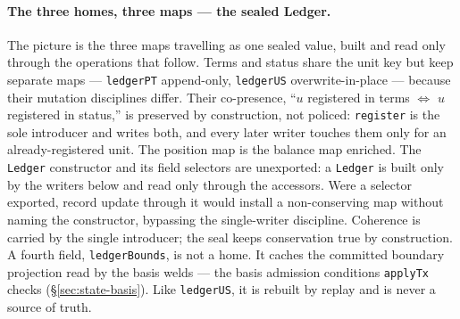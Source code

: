 \paragraph{The three homes, three maps --- the sealed Ledger.}
The picture is the three maps travelling as one sealed value, built and read only through
the operations that follow. Terms and status share the unit key but keep separate maps
--- \texttt{ledgerPT} append-only, \texttt{ledgerUS} overwrite-in-place --- because their
mutation disciplines differ. Their co-presence, ``$u$ registered in terms $\iff$ $u$
registered in status,'' is preserved by construction, not policed: \texttt{register} is
the sole introducer and writes both, and every later writer touches them only for an
already-registered unit. The position map is the balance map enriched. The
\texttt{Ledger} constructor and its field selectors are unexported: a \texttt{Ledger} is
built only by the writers below and read only through the accessors. Were a selector
exported, record update through it would install a non-conserving map without naming the
constructor, bypassing the single-writer discipline. Coherence is carried by the single
introducer; the seal keeps conservation true by construction. A fourth field,
\texttt{ledgerBounds}, is not a home. It caches the committed boundary projection read by
the basis welds --- the basis admission conditions \texttt{applyTx} checks
(\S\ref{sec:state-basis}). Like \texttt{ledgerUS}, it is rebuilt by replay and is never a
source of truth.

